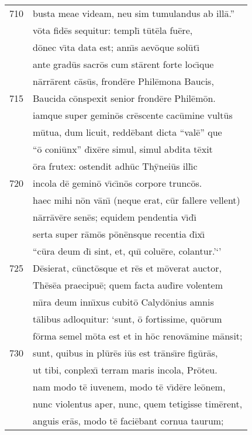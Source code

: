 \documentclass[paper=6in:9in,pagesize=pdftex,
               headinclude=on,footinclude=on,12pt]{scrbook}
\begin{document}
\begin{longtable}[p]{ r l }
710 & busta meae videam, neu sim tumulandus ab ill\=a.''\\ 
 & v\=ota fid\=es sequitur: templ\={\i} t\=ut\=ela fu\=ere,\\ 
 & d\=onec v\={\i}ta data est; ann\={\i}s aev\=oque sol\=ut\={\i}\\ 
 & ante grad\=us sacr\=os cum st\=arent forte loc\={\i}que\\ 
 & n\=arr\=arent c\=as\=us, frond\=ere Phil\=emona Baucis,\\ 
715 & Baucida c\=onspexit senior frond\=ere Phil\=em\=on.\\ 
 & iamque super gemin\=os cr\=escente cac\=umine vult\=us\\ 
 & m\=utua, dum licuit, redd\=ebant dicta ``val\=e'' que\\ 
 & ``\=o coni\=unx'' d\={\i}x\=ere simul, simul abdita t\=exit\\ 
 & \=ora frutex: ostendit adh\=uc Th\=ynei\=us ill\={\i}c\\ 
720 & incola d\=e gemin\=o v\={\i}c\={\i}n\=os corpore trunc\=os.\\ 
 & haec mihi n\=on v\=an\={\i} (neque erat, c\=ur fallere vellent)\\ 
 & n\=arr\=av\=ere sen\=es; equidem pendentia v\={\i}d\={\i}\\ 
 & serta super r\=am\=os p\=on\=ensque recentia d\={\i}x\={\i}\\ 
 & ``c\=ura deum d\={\i} sint, et, qu\={\i} colu\=ere, colantur.'`'\\ 
725 & \indent D\=esierat, c\=unct\=osque et r\=es et m\=overat auctor,\\ 
 & Th\=es\=ea praecipu\=e; quem facta aud\={\i}re volentem\\ 
 & m\={\i}ra deum inn\={\i}xus cubit\=o Calyd\=onius amnis\\ 
 & t\=alibus adloquitur: `sunt, \=o fortissime, qu\=orum\\ 
 & f\=orma semel m\=ota est et in h\=oc renov\=amine m\=ansit;\\ 
730 & sunt, quibus in pl\=ur\=es i\=us est tr\=ans\={\i}re fig\=ur\=as,\\ 
 & ut tibi, conplex\={\i} terram maris incola, Pr\=oteu.\\ 
 & nam modo t\=e iuvenem, modo t\=e v\={\i}d\=ere le\=onem,\\ 
 & nunc violentus aper, nunc, quem tetigisse tim\=erent,\\ 
 & anguis er\=as, modo t\=e faci\=ebant cornua taurum;\\ 

\end{longtable}
\end{document}
